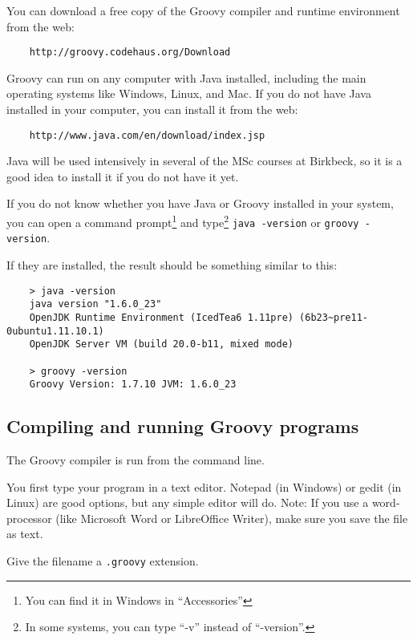  
You can download a free copy of the Groovy compiler and runtime environment 
from the web:

\begin{verbatim}
    http://groovy.codehaus.org/Download
\end{verbatim}

Groovy can run on any computer with Java installed, including the main
operating systems like Windows, Linux, and Mac. If you do not have
Java installed in your computer, you can install it from the web:

\begin{verbatim}
    http://www.java.com/en/download/index.jsp
\end{verbatim}

Java will be used intensively in several of the MSc courses 
at Birkbeck, so it is a good idea to install it if you do not have it
yet.

If you do not know whether you have Java or Groovy installed in your
system, you can open a command prompt\footnote{You can find it in Windows in
  ``Accessories''} and type\footnote{In some systems, you can type
  ``-v'' instead of ``-version''.} \verb+java -version+ 
or \verb+groovy -version+. 

If they are installed, the result should be something similar to this:

\begin{verbatim}
    > java -version
    java version "1.6.0_23"
    OpenJDK Runtime Environment (IcedTea6 1.11pre) (6b23~pre11-0ubuntu1.11.10.1)
    OpenJDK Server VM (build 20.0-b11, mixed mode)

    > groovy -version
    Groovy Version: 1.7.10 JVM: 1.6.0_23
\end{verbatim}



\subsection*{Compiling and running Groovy programs}

The Groovy compiler is run from the command line.

You first type your program in a text editor. Notepad (in Windows) or
gedit (in Linux) are good options, but any simple editor will
do. Note: If you use a word-processor (like Microsoft Word or
LibreOffice Writer), make sure you save the file as text.

Give the filename a \texttt{.groovy} extension.

